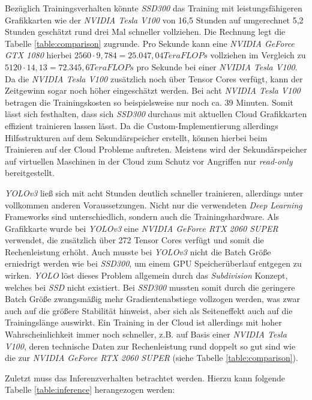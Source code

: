 Bezüglich Trainingsverhalten könnte \textit{SSD300} das Training mit leistungsfähigeren Grafikkarten wie der \textit{NVIDIA Tesla V100} von 16,5 Stunden auf umgerechnet 5,2 Stunden geschätzt rund drei Mal schneller vollziehen. Die Rechnung legt die Tabelle \ref{table:comparison} zugrunde. Pro Sekunde kann eine \textit{NVIDIA GeForce GTX 1080} hierbei $2560\cdot 9,784 = 25.047,04 TeraFLOPs$ vollziehen im Vergleich zu $5120\cdot 14,13 = 72.345,6 TeraFLOPs$ pro Sekunde bei einer \textit{NVIDIA Tesla V100}. Da die \textit{NVIDIA Tesla V100} zusätzlich noch über Tensor Cores verfügt, kann der Zeitgewinn sogar noch höher eingeschätzt werden. Bei acht \textit{NVIDIA Tesla V100} betragen die Trainingskosten so beispielsweise nur noch ca. 39 Minuten. Somit lässt sich festhalten, dass sich \textit{SSD300} durchaus mit aktuellen Cloud Grafikkarten effizient trainieren lassen lässt. Da die Custom-Implementierung allerdings Hilfsstrukturen auf dem Sekundärspeicher erstellt, können hierbei beim Trainieren auf der Cloud Probleme auftreten. Meistens wird der Sekundärspeicher auf virtuellen Maschinen in der Cloud zum Schutz vor Angriffen nur \textit{read-only} bereitgestellt. 

\textit{YOLOv3} ließ sich mit acht Stunden deutlich schneller trainieren, allerdings unter vollkommen anderen Voraussetzungen. Nicht nur die verwendeten \textit{Deep Learning} Frameworks sind unterschiedlich, sondern auch die Trainingshardware. Als Grafikkarte wurde bei \textit{YOLOv3} eine \textit{NVIDIA GeForce RTX 2060 SUPER} verwendet, die zusätzlich über 272 Tensor Cores verfügt und somit die Rechenleistung erhöht. Auch musste bei \textit{YOLOv3} nicht die Batch Größe erniedrigt werden wie bei \textit{SSD300}, um einem GPU Speicherüberlauf entgegen zu wirken. \textit{YOLO} löst dieses Problem allgemein durch das \textit{Subdivision} Konzept, welches bei \textit{SSD} nicht existiert. Bei \textit{SSD300} mussten somit durch die geringere Batch Größe zwangsmäßig mehr Gradientenabstiege vollzogen werden, was zwar auch auf die größere Stabilität hinweist, aber sich als Seiteneffekt auch auf die Trainingslänge auswirkt. Ein Training in der Cloud ist allerdings mit hoher Wahrscheinlichkeit immer noch schneller, z.B. auf Basis einer \textit{NVIDIA Tesla V100}, deren technische Daten zur Rechenleistung rund doppelt so gut sind wie die zur \textit{NVIDIA GeForce RTX 2060 SUPER} (siehe Tabelle \ref{table:comparison}). 

Zuletzt muss das Inferenzverhalten betrachtet werden. Hierzu kann folgende Tabelle \ref{table:inference} herangezogen werden:

